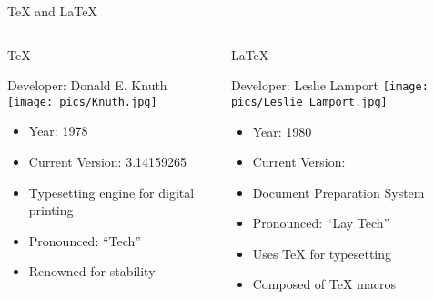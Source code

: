 \documentclass{beamer}
\begin{document}
\begin{frame}{\TeX{} and \LaTeX}
 \begin{columns}[t]
  
  \begin{center}
    {\large \TeX}
    \begin{block}{Developer: Donald E. Knuth}
     \centering
     \texttt{[image: pics/Knuth.jpg]}
    \end{block}
    {\tiny
    \begin{itemize}
    \item Year: 1978
    \item Current Version: 3.14159265
    \item Typesetting engine for digital printing
    \item Pronounced: ``Tech''
    \item Renowned for stability
    \end{itemize}
    }
  \end{center}
  
  
  \begin{center}
    {\large \LaTeX}
    \begin{block}{Developer: Leslie Lamport}
     \centering
      \texttt{[image: pics/Leslie\_Lamport.jpg]}
    \end{block}
    {\tiny
    \begin{itemize}    
    \item Year: 1980
    \item Current Version: \LaTeXe
    \item Document Preparation System  
    \item Pronounced: ``Lay Tech''
    \item Uses \TeX{} for typesetting
    \item Composed of \TeX{} macros
    \end{itemize}
    }
    \end{center}
 \end{columns}
\end{frame}
\end{document}
